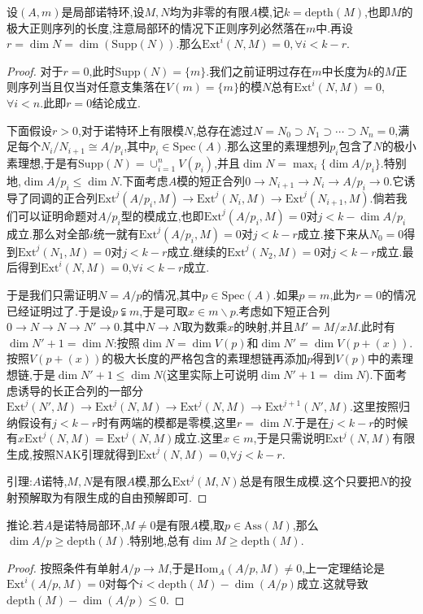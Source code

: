 设$(A,m)$是局部诺特环,设$M,N$均为非零的有限$A$模,记$k=\mathrm{depth}(M)$,也即$M$的极大正则序列的长度,注意局部环的情况下正则序列必然落在$m$中.再设$r=\dim N=\dim(\mathrm{Supp}(N))$.那么$\mathrm{Ext}^i(N,M)=0,\forall i<k-r$.
\begin{proof}
	
	对于$r=0$,此时$\mathrm{Supp}(N)=\{m\}$.我们之前证明过存在$m$中长度为$k$的$M$正则序列当且仅当对任意支集落在$V(m)=\{m\}$的模$N$总有$\mathrm{Ext}^i(N,M)=0$,$\forall i<n$.此即$r=0$结论成立.
	
	下面假设$r>0$,对于诺特环上有限模$N$,总存在滤过$N=N_0\supset N_1\supset\cdots\supset N_n=0$,满足每个$N_i/N_{i+1}\cong A/p_i$,其中$p_i\in\mathrm{Spec}(A)$.那么这里的素理想列$p_i$包含了$N$的极小素理想,于是有$\mathrm{Supp}(N)=\cup_{i=1}^nV(p_i)$,并且$\dim N=\max_i\{\dim A/p_i\}$.特别地,$\dim A/p_i\le\dim N$.下面考虑$A$模的短正合列$0\to N_{i+1}\to N_i\to A/p_i\to0$.它诱导了同调的正合列$\mathrm{Ext}^j(A/p_i,M)\to\mathrm{Ext}^j(N_i,M)\to\mathrm{Ext}^j(N_{i+1},M)$.倘若我们可以证明命题对$A/p_i$型的模成立,也即$\mathrm{Ext}^j(A/p_i,M)=0$对$j<k-\dim A/p_i$成立.那么对全部$i$统一就有$\mathrm{Ext}^j(A/p_i,M)=0$对$j<k-r$成立.接下来从$N_0=0$得到$\mathrm{Ext}^j(N_1,M)=0$对$j<k-r$成立.继续的$\mathrm{Ext}^j(N_2,M)=0$对$j<k-r$成立.最后得到$\mathrm{Ext}^i(N,M)=0$,$\forall i<k-r$成立.
	
	于是我们只需证明$N=A/p$的情况,其中$p\in\mathrm{Spec}(A)$.如果$p=m$,此为$r=0$的情况已经证明过了.于是设$p\subsetneqq m$,于是可取$x\in m\backslash p$.考虑如下短正合列$0\to N\to N\to N'\to0$.其中$N\to N$取为数乘$x$的映射,并且$M'=M/xM$.此时有$\dim N'+1=\dim N$:按照$\dim N=\dim V(p)$和$\dim N'=\dim V(p+(x))$.按照$V(p+(x))$的极大长度的严格包含的素理想链再添加$p$得到$V(p)$中的素理想链,于是$\dim N'+1\le\dim N$(这里实际上可说明$\dim N'+1=\dim N$).下面考虑诱导的长正合列的一部分$\mathrm{Ext}^j(N',M)\to\mathrm{Ext}^j(N,M)\to\mathrm{Ext}^j(N,M)\to\mathrm{Ext}^{j+1}(N',M)$.这里按照归纳假设有$j<k-r$时有两端的模都是零模,这里$r=\dim N$.于是在$j<k-r$的时候有$x\mathrm{Ext}^j(N,M)=\mathrm{Ext}^j(N,M)$成立.这里$x\in m$,于是只需说明$\mathrm{Ext}^j(N,M)$有限生成,按照NAK引理就得到$\mathrm{Ext}^j(N,M)=0$,$\forall j<k-r$.
	
	引理:$A$诺特,$M,N$是有限$A$模,那么$\mathrm{Ext}^j(M,N)$总是有限生成模.这个只要把$N$的投射预解取为有限生成的自由预解即可.
\end{proof}

推论.若$A$是诺特局部环,$M\not=0$是有限$A$模,取$p\in\mathrm{Ass}(M)$,那么$\dim A/p\ge\mathrm{depth}(M)$.特别地,总有$\dim M\ge\mathrm{depth}(M)$.
\begin{proof}
	
	按照条件有单射$A/p\to M$,于是$\mathrm{Hom}_A(A/p,M)\not=0$,上一定理结论是$\mathrm{Ext}^i(A/p,M)=0$对每个$i<\mathrm{depth}(M)-\dim(A/p)$成立.这就导致$\mathrm{depth}(M)-\dim(A/p)\le0$.
\end{proof}

